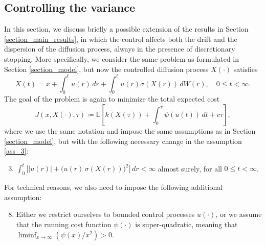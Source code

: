 \documentclass[11pt,tbtags,reqno]{article}
\theoremstyle{definition}
\numberwithin{equation}{section}
\theoremstyle{definition}
\begin{document}
\begin{appendices}

\section{Controlling the variance}

In this section, we discuss briefly a possible extension of the results in Section \ref{section_main_results}, in which
the control affects both the drift and the dispersion of the diffusion process, always in the presence of discretionary stopping. More specifically, we consider the same problem as formulated in Section \ref{section_model}, but now the controlled diffusion process $X(\cdot)$ satisfies 
\begin{equation}\label{controlled_sde_with_variance}
    X(t) = x + \int_{0}^{t} u(r) \,dr + \int_{0}^{t} u(r)\sigma (X(r)) \, dW(r), \quad 0 \le t < \infty.
\end{equation}
The goal of the problem is again to minimize the total expected cost
\begin{equation}\label{total_cost_extension_section}
    J(x, X(\cdot), \tau) \coloneqq \mathbb{E}\left[k(X(\tau))+\int_{0}^{\tau} \psi(u(t)) \, dt + c \tau\right],
\end{equation}
where we use the same notation and impose the same assumptions as in Section \ref{section_model}, but with the following necessary change in the assumption \ref{ass_3}:
\begin{enumerate}[label = \textbf{(A\arabic*)$'$}]
\setcounter{enumi}{2}
    \item $\int_{0}^{t}\big[|u(r)|+\big(u(r)\, \sigma(X(r))\big)^{2}\big] \, dr < \infty$ almost surely, for all $0 \leq t < \infty$. \label{ass_3_ext}
\end{enumerate}
For technical reasons, we also need to impose the following additional assumption:
\begin{enumerate}[label = \textbf{(A\arabic*)}]
\setcounter{enumi}{7}
    \item Either we restrict ourselves to bounded control processes $u(\cdot)$, or we assume that the running cost function $\psi(\cdot)$ is super-quadratic, meaning that $\liminf_{x \to \infty} \left(\psi(x)/x^2\right) > 0$. \label{ass_8_ext}
\end{enumerate}


\end{appendices}
\end{document}
